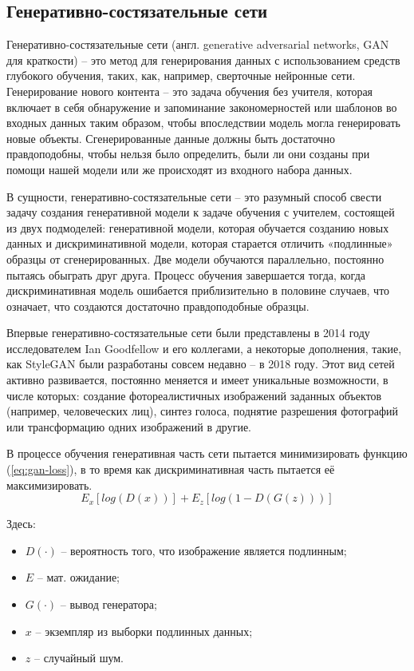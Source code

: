 \subsection{Генеративно-состязательные сети}
Генеративно-состязательные сети (англ. generative adversarial networks, GAN для краткости) -- это метод для генерирования данных с использованием средств глубокого обучения, таких, как, например, сверточные нейронные сети. Генерирование нового контента -- это задача обучения без учителя, которая включает в себя обнаружение и запоминание закономерностей или шаблонов во входных данных таким образом, чтобы впоследствии модель могла генерировать новые объекты. Сгенерированные данные должны быть достаточно правдоподобны, чтобы нельзя было определить, были ли они созданы при помощи нашей модели или же происходят из входного набора данных.

В сущности, генеративно-состязательные сети – это разумный способ свести задачу создания генеративной модели к задаче обучения с учителем, состоящей из двух подмоделей: генеративной модели, которая обучается созданию новых данных и дискриминативной модели, которая старается отличить «подлинные» образцы от сгенерированных. Две модели обучаются параллельно, постоянно пытаясь обыграть друг друга. Процесс обучения завершается тогда, когда дискриминативная модель ошибается приблизительно в половине случаев, что означает, что создаются достаточно правдоподобные образцы.

Впервые генеративно-состязательные сети были представлены в 2014 году исследователем Ian Goodfellow и его коллегами\cite{gan-introduction}, а некоторые дополнения, такие, как StyleGAN были разработаны совсем недавно -- в 2018 году\cite{gan-stylegan}. Этот вид сетей активно развивается, постоянно меняется и имеет уникальные возможности, в числе которых: создание фотореалистичных изображений заданных объектов (например, человеческих лиц), синтез голоса, поднятие разрешения фотографий\cite{gan-upscaling} или трансформацию одних изображений в другие.

В процессе обучения генеративная часть сети пытается минимизировать функцию (\ref{eq:gan-loss}), в то время как дискриминативная часть пытается её максимизировать. 
 \begin{equation}
 	\label{eq:gan-loss}
	E_x[log(D(x))] + E_z[log(1 - D(G(z)))]
 \end{equation}

Здесь:
\begin{itemize}
	\item $D(\cdot)$ -- вероятность того, что изображение является подлинным;
	\item $E$ -- мат. ожидание;
	\item $G(\cdot)$ -- вывод генератора;
	\item $x$ -- экземпляр из выборки подлинных данных;
	\item $z$ -- случайный шум.
\end{itemize}
